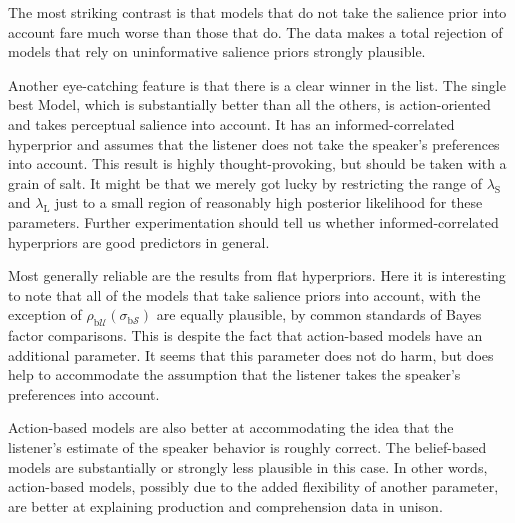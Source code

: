 The most striking contrast is that models that do not take the
salience prior into account fare much worse than those that do. The
data makes a total rejection of models that rely on uninformative
salience priors strongly plausible.

Another eye-catching feature is that there is a clear winner in the
list. The single best Model, which is substantially better than all
the others, is action-oriented and takes perceptual salience into
account. It has an informed-correlated hyperprior and assumes that the
listener does not take the speaker's preferences into account. This
result is highly thought-provoking, but should be taken with a grain
of salt. It might be that we merely got lucky by restricting the range
of $\lambda_\mathrm{S}$ and $\lambda_\mathrm{L}$ just to a small
region of reasonably high posterior likelihood for these
parameters. Further experimentation should tell us whether
informed-correlated hyperpriors are good predictors in general.

Most generally reliable are the results from flat hyperpriors. Here it
is interesting to note that all of the models that take salience
priors into account, with the exception of
$\rho_{\mathrm{b}\mathcal{U}}(\sigma_{\mathrm{b}\mathcal{S}})$ are
equally plausible, by common standards of Bayes factor
comparisons. This is despite the fact that action-based models have an
additional parameter. It seems that this parameter does not do harm,
but does help to accommodate the assumption that the listener takes
the speaker's preferences into account. 

Action-based models are also better at accommodating the idea that the
listener's estimate of the speaker behavior is roughly correct. The
belief-based models are substantially or strongly less plausible in
this case. In other words, action-based models, possibly due to the
added flexibility of another parameter, are better at explaining
production and comprehension data in unison.

